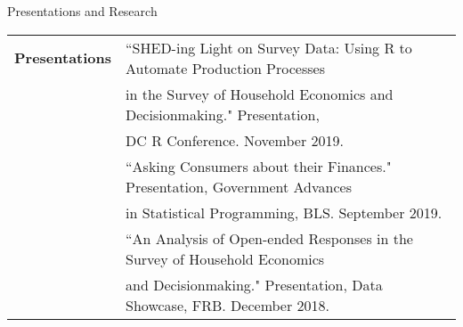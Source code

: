 \documentclass{resume} %
\begin{document}

\begin{rSection}{Presentations and Research }

\begin{tabular}{ @{} >{\bfseries}l @{\hspace{6ex}} l }
Presentations & ``SHED-ing Light on Survey Data: Using R to Automate Production Processes  \\
 & \vspace{.5mm}
in the Survey of Household Economics and Decisionmaking." Presentation, \\
 & \vspace{2mm} 
DC R Conference. November 2019. \\
 & ``Asking Consumers about their Finances." Presentation, Government Advances \\
 & \vspace{2mm}
in Statistical Programming, BLS. September 2019. \\
\vspace{.5mm}
 & ``An Analysis of Open-ended Responses in the Survey of Household Economics \\
 & \vspace{4mm}
and Decisionmaking." Presentation, Data Showcase, FRB. December 2018. 

\end{tabular}

\end{rSection}

\end{document}
